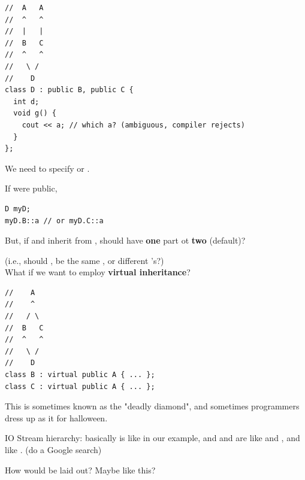 \documentclass[english, 11pt]{article}
\begin{document}
\begin{lstlisting}
//  A   A
//  ^   ^
//  |   |
//  B   C
//  ^   ^
//   \ /
//    D
class D : public B, public C {
  int d;
  void g() {
    cout << a; // which a? (ambiguous, compiler rejects)
  }
};
\end{lstlisting}
We need to specify  or .

\begin{note}
  If  were public,
  \begin{lstlisting}
D myD;
myD.B::a // or myD.C::a
  \end{lstlisting}
  But, if  and  inherit from , should  have \textbf{one}  part ot \textbf{two} (default)?
\end{note}

(i.e., should ,  be the same , or different 's?) \\

What if we want to employ \textbf{virtual inheritance}?

\begin{lstlisting}
//    A
//    ^
//   / \
//  B   C
//  ^   ^
//   \ /
//    D
class B : virtual public A { ... };
class C : virtual public A { ... };
\end{lstlisting}

This is sometimes known as the "deadly diamond", and sometimes programmers dress up as it for halloween.

\begin{exmp}
  IO Stream hierarchy: basically  is like  in our example, and  and  are like  and , and  like . (do a Google search)
\end{exmp}

How would  be laid out? Maybe like this?
\end{document}
